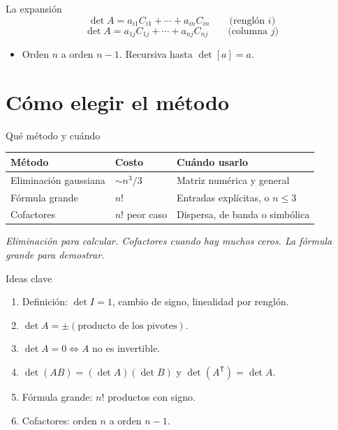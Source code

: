 \documentclass[aspectratio=169,11pt]{beamer}
\newcommand{\dt}[1]{\det #1}
\newcommand{\remate}[1]{%
  \vspace{0.3em}
  \begin{center}\itshape\small #1\end{center}%
}
\begin{document}
\begin{frame}{La expansión}
  \[
    \dt{A} = a_{i1}C_{i1} + \cdots + a_{in}C_{in}
    \qquad \text{(renglón $i$)}
  \]
  \[
    \dt{A} = a_{1j}C_{1j} + \cdots + a_{nj}C_{nj}
    \qquad \text{(columna $j$)}
  \]

  \begin{itemize}
    \item Orden $n$ a orden $n-1$. Recursiva hasta $\dt{[a]} = a$.
  \end{itemize}
\end{frame}


\section{Cómo elegir el método}

\begin{frame}{Qué método y cuándo}
  \begin{center}
    \small
    \begin{tabular}{@{}l l l@{}}
      \toprule
      \textbf{Método} & \textbf{Costo} & \textbf{Cuándo usarlo} \\
      \midrule
      Eliminación gaussiana & $\sim n^3/3$ & Matriz numérica y
                                            general \\
      Fórmula grande & $n!$ & Entradas explícitas, o $n \leq 3$ \\
      Cofactores & $n!$ peor caso & Dispersa, de banda o
                                    simbólica \\
      \bottomrule
    \end{tabular}
  \end{center}

  \remate{Eliminación para calcular. Cofactores cuando hay muchos
          ceros. La fórmula grande para demostrar.}
\end{frame}

\begin{frame}{Ideas clave}
  \begin{enumerate}
    \item Definición: $\dt{I} = 1$, cambio de signo, linealidad por
          renglón.
    \item $\dt{A} = \pm(\text{producto de los pivotes})$.
    \item $\dt{A} = 0 \iff A$ no es invertible.
    \item $\dt{(AB)} = (\dt{A})(\dt{B})$ y
          $\dt{(A^{\mathsf{T}})} = \dt{A}$.
    \item Fórmula grande: $n!$ productos con signo.
    \item Cofactores: orden $n$ a orden $n-1$.
  \end{enumerate}
\end{frame}
\end{document}
